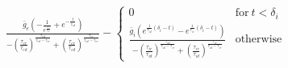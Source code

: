 \documentclass[10pt,a4paper]{article}
\begin{document}
\begin{eqnarray}
\frac{\bar{g}_e \left(- \frac{1}{e^{\frac{t}{\tau_{er}}}} + e^{- \frac{t}{\tau_{ed}}}\right)}{- \left(\frac{\tau_{er}}{\tau_{ed}}\right)^{\frac{\tau_{ed}}{\tau_{ed} - \tau_{er}}} + \left(\frac{\tau_{er}}{\tau_{ed}}\right)^{\frac{\tau_{er}}{\tau_{ed} - \tau_{er}}}} - \begin{cases} 0 & \text{for}\: t < \delta_i \\\frac{\bar{g}_i \left(e^{\frac{1}{\tau_{id}} \left(\delta_i - t\right)} - e^{\frac{1}{\tau_{ir}} \left(\delta_i - t\right)}\right)}{- \left(\frac{\tau_{ir}}{\tau_{id}}\right)^{\frac{\tau_{id}}{\tau_{id} - \tau_{ir}}} + \left(\frac{\tau_{ir}}{\tau_{id}}\right)^{\frac{\tau_{ir}}{\tau_{id} - \tau_{ir}}}} & \text{otherwise} \end{cases}
\end{eqnarray}
\end{document}
